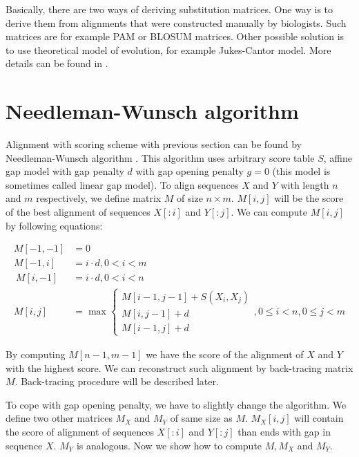 Basically, there are two ways of deriving substitution matrices. One way is
to derive them from alignments that were constructed manually by biologists. Such
matrices are for example PAM or BLOSUM matrices. Other possible solution is to
use theoretical model of evolution, for example Jukes-Cantor model. More details
can be found in \cite{Durbin1998}.

\section{Needleman-Wunsch algorithm}

Alignment with scoring scheme with previous section can be found by
Needleman-Wunsch algorithm \cite{Durbin1998}.
This algorithm uses arbitrary score table $S$, affine gap model with gap penalty
$d$ with
gap opening penalty $g=0$ (this model is sometimes called linear gap model). To
align sequences $X$ and $Y$ with length $n$ and $m$ respectively, we define
matrix $M$ of size $n\times m$. $M[i,j]$ will be the score of the best alignment
of sequences $X[:i]$ and $Y[:j]$. We can compute $M[i,j]$ by following
equations:

\begin{align} 
M[-1,-1] &= 0\\
M[-1,i] &= i\cdot d, 0< i < m\\\
M[i,-1] &= i\cdot d, 0< i < n\\
M[i,j] &= \max
\begin{cases}
 M[i-1,j-1]+S(X_i,X_j)\\M[i,j-1]+d\\
 M[i-1,j]+d
\end{cases}, 0\leq i<n,0\leq j<m \label{ALIGN:ALGO:AFFINE}
\end{align}

By computing $M[n-1,m-1]$ we have the score of the alignment of $X$ and $Y$ with
the highest score. We can reconstruct such alignment by back-tracing matrix $M$.
Back-tracing procedure will be described later.

To cope with gap opening penalty, we have to slightly change the algorithm.
We define two other matrices $M_X$ and $M_Y$ of same size as $M$. $M_X[i,j]$
will contain the score of alignment of sequences $X[:i]$ and $Y[:j]$ than ends
with gap in sequence $X$. $M_Y$ is analogous. Now we show how to compute $M,M_X$
and $M_Y$. 

